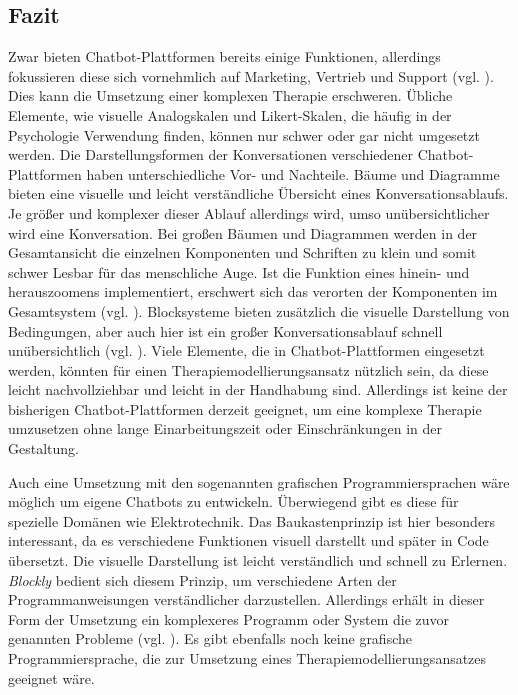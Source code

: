 \subsection{Fazit}

Zwar bieten Chatbot-Plattformen bereits einige Funktionen, allerdings fokussieren diese sich vornehmlich auf Marketing, Vertrieb und Support (vgl. \cite{Chatfuel3:online} \cite{Converse15:online} \cite{ManyChat78:online}). Dies kann die Umsetzung einer komplexen Therapie erschweren. Übliche Elemente, wie visuelle Analogskalen und Likert-Skalen, die häufig in der Psychologie Verwendung finden, können nur schwer oder gar nicht umgesetzt werden. Die Darstellungsformen der Konversationen verschiedener Chatbot-Plattformen haben unterschiedliche Vor- und Nachteile. Bäume und Diagramme bieten eine visuelle und leicht verständliche Übersicht eines Konversationsablaufs. Je größer und komplexer dieser Ablauf allerdings wird, umso unübersichtlicher wird eine Konversation. Bei großen Bäumen und Diagrammen werden in der Gesamtansicht die einzelnen Komponenten und Schriften zu klein und somit schwer Lesbar für das menschliche Auge. Ist die Funktion eines hinein- und herauszoomens implementiert, erschwert sich das verorten der Komponenten im Gesamtsystem (vgl. \cite{Hornbaek2003}). Blocksysteme bieten zusätzlich die visuelle Darstellung von Bedingungen, aber auch hier ist ein großer Konversationsablauf schnell unübersichtlich (vgl. \cite{Hornbaek2003}). Viele Elemente, die in Chatbot-Plattformen eingesetzt werden, könnten für einen Therapiemodellierungsansatz nützlich sein, da diese leicht nachvollziehbar und leicht in der Handhabung sind. Allerdings ist keine der bisherigen Chatbot-Plattformen derzeit geeignet, um eine komplexe Therapie umzusetzen ohne lange Einarbeitungszeit oder Einschränkungen in der Gestaltung. 

Auch eine Umsetzung mit den sogenannten grafischen Programmiersprachen wäre möglich um eigene Chatbots zu entwickeln. Überwiegend gibt es diese für spezielle Domänen wie Elektrotechnik. Das Baukastenprinzip ist hier besonders interessant, da es verschiedene Funktionen visuell darstellt und später in Code übersetzt. Die visuelle Darstellung ist leicht verständlich und schnell zu Erlernen. \emph{Blockly} bedient sich diesem Prinzip, um verschiedene Arten der Programmanweisungen verständlicher darzustellen. Allerdings erhält in dieser Form der Umsetzung ein komplexeres Programm oder System die zuvor genannten Probleme (vgl. \cite{Hornbaek2003}). Es gibt ebenfalls noch keine grafische Programmiersprache, die zur Umsetzung eines Therapiemodellierungsansatzes geeignet wäre. 

